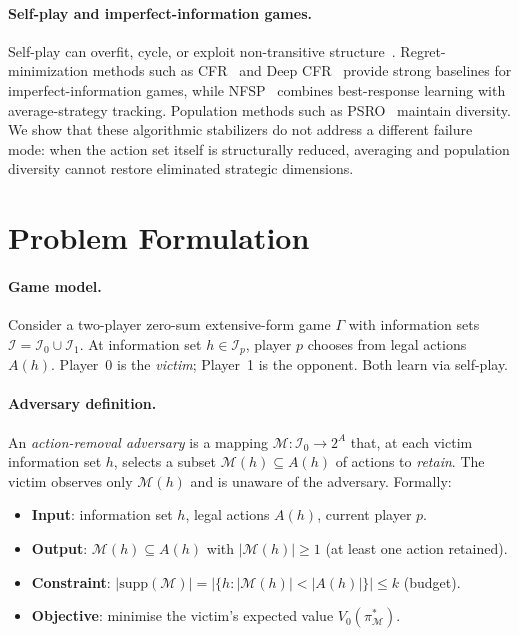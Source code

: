 \documentclass{article}
\begin{document}
\paragraph{Self-play and imperfect-information games.}
Self-play can overfit, cycle, or exploit non-transitive structure~\citep{balduzzi2019open,lanctot2019openspiel}. Regret-minimization methods such as CFR~\citep{zinkevich2007regret} and Deep CFR~\citep{brown2019deep} provide strong baselines for imperfect-information games, while NFSP~\citep{heinrich2016deep} combines best-response learning with average-strategy tracking. Population methods such as PSRO~\citep{lanctot2017unified} maintain diversity. We show that these algorithmic stabilizers do not address a different failure mode: when the action set itself is structurally reduced, averaging and population diversity cannot restore eliminated strategic dimensions.

\section{Problem Formulation}

\paragraph{Game model.}
Consider a two-player zero-sum extensive-form game $\Gamma$ with information sets $\mathcal{I} = \mathcal{I}_0 \cup \mathcal{I}_1$. At information set $h \in \mathcal{I}_p$, player $p$ chooses from legal actions $A(h)$. Player~0 is the \emph{victim}; Player~1 is the opponent. Both learn via self-play.

\paragraph{Adversary definition.}
An \emph{action-removal adversary} is a mapping $\mathcal{M}: \mathcal{I}_0 \to 2^A$ that, at each victim information set $h$, selects a subset $\mathcal{M}(h) \subseteq A(h)$ of actions to \emph{retain}. The victim observes only $\mathcal{M}(h)$ and is unaware of the adversary. Formally:

\begin{itemize}
\item \textbf{Input}: information set $h$, legal actions $A(h)$, current player $p$.
\item \textbf{Output}: $\mathcal{M}(h) \subseteq A(h)$ with $|\mathcal{M}(h)| \geq 1$ (at least one action retained).
\item \textbf{Constraint}: $|\text{supp}(\mathcal{M})| = |\{h : |\mathcal{M}(h)| < |A(h)|\}| \leq k$ (budget).
\item \textbf{Objective}: minimise the victim's expected value $V_0(\pi^*_\mathcal{M})$.
\end{itemize}
\end{document}
